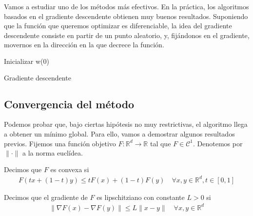 Vamos a estudiar uno de los métodos más efectivos. En la práctica, los algoritmos basados en el gradiente descendente obtienen muy buenos resultados. Suponiendo que la función que queremos optimizar es diferenciable, la idea del gradiente descendente consiste en partir de un punto aleatorio, y, fijándonos en el gradiente, movernos en la dirección en la que decrece la función. 

\begin{algorithm}
	\SetAlgoLined
	Inicializar w(0)\\
	\caption{Gradiente descendente}
\end{algorithm}


\subsection{Convergencia del método}
Podemos probar que, bajo ciertas hipótesis no muy restrictivas, el algoritmo llega a obtener un mínimo global. Para ello, vamos a demostrar algunos resultados previos. Fijemos una función objetivo $F \colon \mathbb{R}^d \to \mathbb{R}$ tal que $F \in \mathcal{C}^1$. Denotemos por $\| \cdot \|$ a la norma euclídea.

\begin{definition}
	Decimos que $F$ es convexa si
	\begin{align*}
		F(tx + (1-t)y) \leq tF(x) + (1-t)F(y) \quad \forall x, y \in \mathbb{R}^d, t \in [0,1]
	\end{align*}
\end{definition}

\begin{definition}
	Decimos que el gradiente de $F$ es lipschitziano con constante $L>0$ si 
	\begin{align*}
		\| \nabla F(x) - \nabla F(y)\| \leq L \| x-y \| \quad \forall x, y \in \mathbb{R}^d
	\end{align*}
\end{definition}

